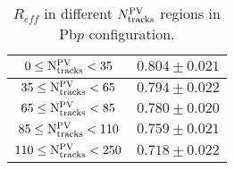 \begin{table}[H]
\centering
\caption{$R_{eff}$ in different $N_{\rm tracks}^{\rm PV}$ regions in Pb$p$ configuration.}
\begin{center}
\begin{tabular}{c|c}
\hline
$0 \leq \mathrm{N_{\rm tracks}^{\rm PV}} < 35$ & $0.804 \pm 0.021$ \\
\hline
$35 \leq \mathrm{N_{\rm tracks}^{\rm PV}} < 65$ & $0.794 \pm 0.022$ \\
\hline
$65 \leq \mathrm{N_{\rm tracks}^{\rm PV}} < 85$ & $0.780 \pm 0.020$ \\
\hline
$85 \leq \mathrm{N_{\rm tracks}^{\rm PV}} < 110$ & $0.759 \pm 0.021$ \\
\hline
$110 \leq \mathrm{N_{\rm tracks}^{\rm PV}} < 250$ & $0.718 \pm 0.022$ \\
\hline
\end{tabular}
\end{center}
\label{ReffTable_NFor_Pbp}
\end{table}

